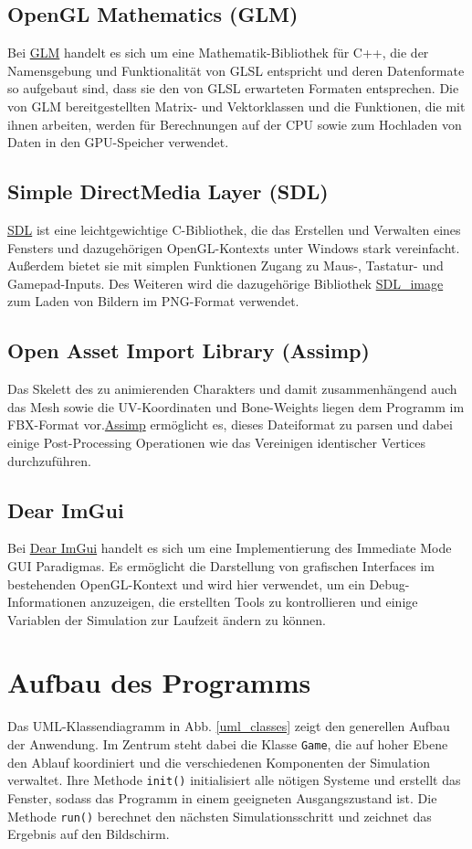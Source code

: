 \subsection{OpenGL Mathematics (GLM)}
Bei \href{https://glm.g-truc.net/0.9.9/index.html}{GLM} handelt es sich um eine Mathematik-Bibliothek für C++, die der Namensgebung und Funktionalität von GLSL entspricht und deren Datenformate so aufgebaut sind, dass sie den von GLSL erwarteten Formaten entsprechen. Die von GLM bereitgestellten Matrix- und Vektorklassen und die Funktionen, die mit ihnen arbeiten, werden für Berechnungen auf der CPU sowie zum Hochladen von Daten in den GPU-Speicher verwendet.

\subsection{Simple DirectMedia Layer (SDL)}
\href{https://www.libsdl.org/index.php}{SDL} ist eine leichtgewichtige C-Bibliothek, die das Erstellen und Verwalten eines Fensters und dazugehörigen OpenGL-Kontexts unter Windows stark vereinfacht. Außerdem bietet sie mit simplen Funktionen Zugang zu Maus-, Tastatur- und Gamepad-Inputs. Des Weiteren wird die dazugehörige Bibliothek \href{https://www.libsdl.org/projects/SDL_image/}{SDL\_image} zum Laden von Bildern im PNG-Format verwendet.

\subsection{Open Asset Import Library (Assimp)}
Das Skelett des zu animierenden Charakters und damit zusammenhängend auch das Mesh sowie die UV-Koordinaten und Bone-Weights liegen dem Programm im FBX-Format vor.\href{http://assimp.org/}{Assimp} ermöglicht es, dieses Dateiformat zu parsen und dabei einige Post-Processing Operationen wie das Vereinigen identischer Vertices durchzuführen.

\subsection{Dear ImGui}
Bei \href{https://github.com/ocornut/imgui}{Dear ImGui} handelt es sich um eine Implementierung des Immediate Mode GUI Paradigmas. Es ermöglicht die Darstellung von grafischen Interfaces im bestehenden OpenGL-Kontext und wird hier verwendet, um ein Debug-Informationen anzuzeigen, die erstellten Tools zu kontrollieren und einige Variablen der Simulation zur Laufzeit ändern zu können.

\section{Aufbau des Programms}
Das UML-Klassendiagramm in Abb. \ref{uml_classes} zeigt den generellen Aufbau der Anwendung. Im Zentrum steht dabei die Klasse \lstinline{Game}, die auf hoher Ebene den Ablauf koordiniert und die verschiedenen Komponenten der Simulation verwaltet. Ihre Methode \lstinline{init()} initialisiert alle nötigen Systeme und erstellt das Fenster, sodass das Programm in einem geeigneten Ausgangszustand ist. Die Methode \lstinline{run()} berechnet den nächsten Simulationsschritt und zeichnet das Ergebnis auf den Bildschirm.

